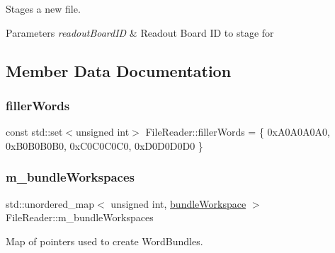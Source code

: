 Stages a new file. 


\begin{DoxyParams}{Parameters}
{\em readout\+Board\+ID} & Readout Board ID to stage for \\
\hline
\end{DoxyParams}


\subsection{Member Data Documentation}
\mbox{\label{class_file_reader_a7a0bb5e7cb117f6a415f005665893509}} 
\subsubsection{\texorpdfstring{filler\+Words}{fillerWords}}
{\footnotesize\ttfamily const std\+::set$<$unsigned int$>$ File\+Reader\+::filler\+Words = \{ 0x\+A0\+A0\+A0\+A0, 0x\+B0\+B0\+B0\+B0, 0x\+C0\+C0\+C0\+C0, 0x\+D0\+D0\+D0\+D0 \}\hspace{0.3cm}{\ttfamily [private]}}

\mbox{\label{class_file_reader_aa04e6f9a40c9186cae2c89352e75d69c}} 
\subsubsection{\texorpdfstring{m\+\_\+bundle\+Workspaces}{m\_bundleWorkspaces}}
{\footnotesize\ttfamily std\+::unordered\+\_\+map$<$ unsigned int, \hyperlink{class_file_reader_a7fb625dc45cee3256d37cc19c65cad86}{bundle\+Workspace} $>$ File\+Reader\+::m\+\_\+bundle\+Workspaces\hspace{0.3cm}{\ttfamily [private]}}



Map of pointers used to create Word\+Bundles. 

\mbox{\label{class_file_reader_a7e3ce1501c6bd018d818aab3bfa18cdb}} 
